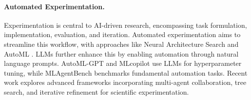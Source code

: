\paragraph{Automated Experimentation.} %
Experimentation is central to AI-driven research, encompassing task formulation, implementation, evaluation, and iteration. Automated experimentation aims to streamline this workflow, with approaches like Neural Architecture Search \cite{elsken2019neural} and AutoML \cite{he2021automl}. LLMs further enhance this by enabling automation through natural language prompts. AutoML-GPT \cite{tsai2023automl} and MLcopilot \cite{zhang2023mlcopilot} use LLMs for hyperparameter tuning, while MLAgentBench \cite{huang2024mlagentbench} benchmarks fundamental automation tasks. Recent work explores advanced frameworks incorporating multi-agent collaboration, tree search, and iterative refinement for scientific experimentation.


